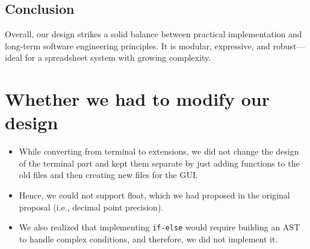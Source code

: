 \documentclass{article}
\begin{document}
\subsection*{Conclusion}

Overall, our design strikes a solid balance between practical implementation and long-term software engineering principles. It is modular, expressive, and robust—ideal for a spreadsheet system with growing complexity.

\section*{Whether we had to modify our design}
\begin{itemize}
    \item While converting from terminal to extensions, we did not change the design of the terminal part and kept them separate by just adding functions to the old files and then creating new files for the GUI.
    \item Hence, we could not support float, which we had proposed in the original proposal (i.e., decimal point precision).
    \item We also realized that implementing \texttt{if-else} would require building an AST to handle complex conditions, and therefore, we did not implement it.
\end{itemize}
\end{document}
